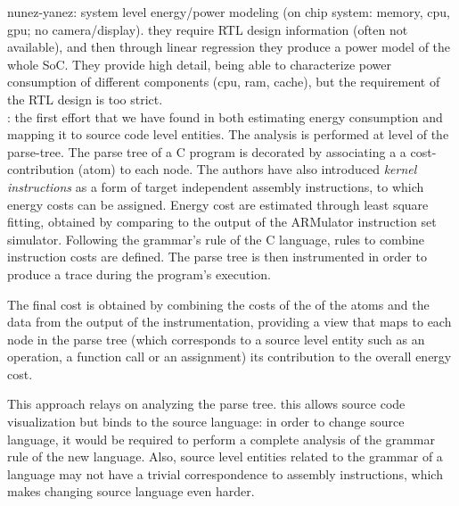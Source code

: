 nunez-yanez: system level energy/power modeling (on chip system: memory, cpu, gpu; no camera/display). they require RTL design information (often not available), and then through linear regression they produce a power model of the whole SoC. They provide high detail, being able to characterize power consumption of different components (cpu, ram, cache), but the requirement of the RTL design is too strict. \\[1in]


\cite{brando2008}: the first effort that we have found in both estimating energy consumption and mapping it to source code level entities. The analysis is performed at level of the parse-tree. The parse tree of a C program is decorated by associating a a cost-contribution (atom) to each node. The authors have also introduced \emph{kernel instructions} as a form of target independent assembly instructions, to which energy costs can be assigned. Energy cost are estimated through least square fitting, obtained by comparing to the output of the ARMulator instruction set simulator. Following the grammar's rule of the C language, rules to combine instruction costs are defined. The parse tree is then instrumented in order to produce a trace during the program's execution. \par 
The final cost is obtained by combining the costs of the of the atoms and the data from the output of the instrumentation, providing a view that maps to each node in the parse tree (which corresponds to a source level entity such as an operation, a function call or an assignment) its contribution to the overall energy cost. \par 
This approach relays on analyzing the parse tree. this allows source code visualization but binds to the source language: in order to change source language, it would be required to perform a complete analysis of the grammar rule of the new language. Also, source level entities related to the grammar of a language may not have a trivial correspondence to assembly instructions, which makes changing source language even harder. \\[1in]


